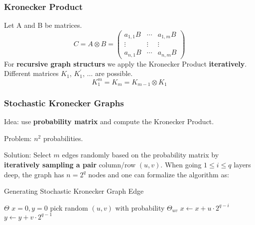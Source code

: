 \documentclass[parskip=full]{scrartcl}
\begin{document}
\subsubsection{Kronecker Product}
Let A and B be matrices.
\[C = A \otimes B = 
\begin{pmatrix}
a_{1,1}B & \cdots & a_{1,m}B \\
\vdots & \vdots & \vdots \\
a_{n,1}B & \cdots & a_{n,m}B
\end{pmatrix}\]
For \textbf{recursive graph structurs} we apply the Kronecker Product \textbf{iteratively}. Different matrices $K_1$, $K_1^{'}$, $\ldots$ are possible.
\[K_1^{m} = K_m = K_{m-1} \otimes K_1\]

\subsubsection{Stochastic Kronecker Graphs}
Idea: use \textbf{probability matrix} and compute the Kronecker Product.

Problem: $n^2$ probabilities.

Solution: Select $m$ edges randomly based on the probability matrix by \textbf{iteratively sampling a pair} column/row $(u,v)$.\newline
When going $1 \leqslant i \leqslant q$ layers deep, the graph has $n = 2^q$ nodes and one can formalize the algorithm as:
\begin{algorithm}
\caption{Generating Stochastic Kronecker Graph Edge}
\begin{algorithmic}
	\State $\Theta$ 
	\State $x = 0, y = 0$ 
		\State pick random $(u,v)$ with probability $\Theta_{uv}$
		\State $x \gets x + u \cdot 2^{q-i}$
		\State $y \gets y + v \cdot 2^{q-1}$
	\EndFor
\end{algorithmic}
\end{algorithm}
\end{document}
